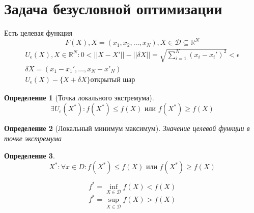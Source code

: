 \documentclass[14pt]{extarticle}
\newtheorem{definition}{Определение}
\begin{document}
\section{Задача безусловной оптимизации}
Есть целевая функция 
\begin{equation}
F(X) , X = (x_1,x_2,\dots,x_{N}), X \in \mathcal{D} \subseteq \mathbb{R}^{N}
\end{equation}
\begin{eqnarray}
	U_{\epsilon}(X), X \in \mathbb{R}^{N} : 0 < ||X-X'|| - ||\delta X|| = \sqrt{\sum_{i=1}^{N} (x_{i} - x_{i}')^2}  < \epsilon\\
	\delta X = (x_1 - x_1',\dots, x_{N} - x'_{N})\\
	U_{\epsilon} (X)  - \{X+ \delta X\} \text{открытый шар}
\end{eqnarray}
\textbf{
}
\begin{definition}[Точка локального экстремума]
	\label{localExtr}
\begin{equation}
	\exists  U_{\epsilon}(X^{*}) : f(X^{*}) \le  f(X) \text{~или~} f(X^{*}) \ge f(X)
\end{equation}
\end{definition}
\begin{definition} [Локальный минимум максимум]
	Значение целевой функции в точке экстремума
\end{definition}
\begin{definition}
	\label{globExtr}
	\begin{equation}
		X^{*}: \forall  x \in D: f(X^{*}) \le  f(X) \text{~или~}
		f(X^{*}) \ge  f(X)
	\end{equation}
\end{definition}
\begin{equation}
	f^{*} =  \inf_{X \in \mathcal{D}}f(X) < f(X)
\end{equation}
\begin{equation}
	f^{*} = \sup_{X \in \mathcal{D}} f(X) > f(X)
\end{equation}
\end{document}
